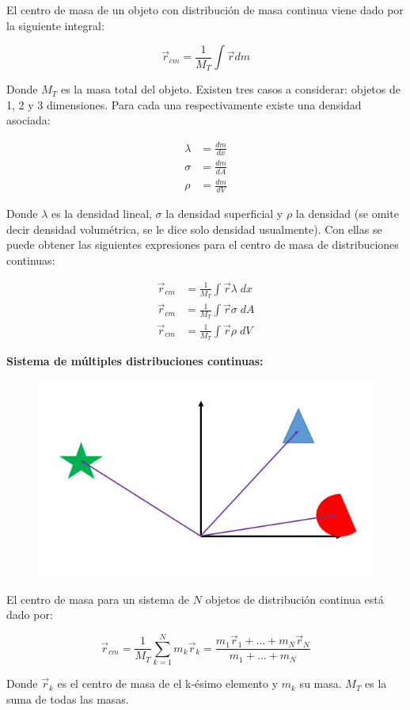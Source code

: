 \documentclass[a4paper,11pt]{article}
\theoremstyle{mytheor}
\begin{document}
El centro de masa de un objeto con distribución de masa continua viene dado por la siguiente integral:

$$  \vec{r}_{cm} = \frac{1}{M_T} \int \vec{r} dm $$

Donde $M_T$ es la masa total del objeto. Existen tres casos a considerar: objetos de 1, 2 y 3 dimensiones. Para cada una respectivamente existe una densidad asociada:

\begin{align*}
\lambda &= \frac{d m}{dx} \\
\sigma &= \frac{d m}{dA} \\
\rho &= \frac{d m}{dV} 
\end{align*}

Donde $\lambda$ es la densidad lineal, $\sigma$ la densidad superficial y $\rho$ la densidad (se omite decir densidad volumétrica, se le dice solo densidad usualmente). Con ellas se puede obtener las siguientes expresiones para el centro de masa de distribuciones continuas:

\begin{align*}
\vec{r}_{cm} &= \frac{1}{M_T} \int \vec{r} \lambda \;dx  \\
\vec{r}_{cm} &= \frac{1}{M_T} \int \vec{r} \sigma \;dA \\
\vec{r}_{cm} &= \frac{1}{M_T} \int \vec{r} \rho\; dV 
\end{align*}

\textbf{Sistema de múltiples distribuciones continuas:}\\

\begin{figure}[h]
	\includegraphics[width=0.5\linewidth]{muchos3d}
	\label{fcN4}
\end{figure}
El centro de masa para un sistema de $N$ objetos de distribución continua está dado por:

$$ \vec{r}_{cm} = \frac{1}{M_{T}}\sum_{k=1}^{N} m_k \vec{r}_k = \frac{m_1\vec{r}_1 + \dots + m_N \vec{r}_N}{m_1 + \dots + m_N}$$

Donde $ \vec{r}_k$ es el centro de masa de el k-ésimo elemento y $m_k$ su masa. $M_T$ es la suma de todas las masas.
\end{document}

